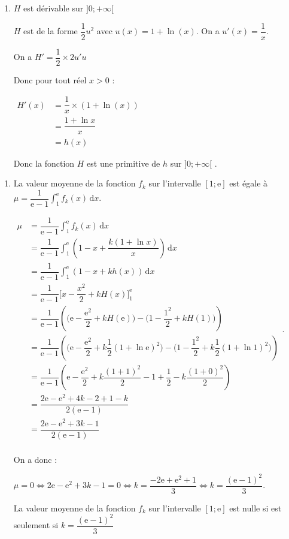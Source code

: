 \documentclass[10pt]{article}
\providecommand{\e}{{\mathrm{e}}}
\renewcommand{\d}{{\mathrm{d}}}
\providecommand{\ds}{\displaystyle}
\begin{document}
\begin{enumerate}
	\item 
	
	$H$ est dérivable sur $] 0 ;+\infty[$ 
	
	$H$ est de la forme $\dfrac{1}{2}u^2$ avec $u(x) = 1 + \ln(x)$. On a  $u'(x) = \dfrac{1}{x}$. 
	
	On a $H'= \dfrac{1}{2} \times 2 u'u $ 
	
	Donc pour tout réel $x>0$ : 
	
	$\begin{aligned} H'(x) &= \dfrac{1}{x} \times \left(1 + \ln(x) \right) \\
		&= \dfrac{1+\ln x}{x} \\
		&=h(x)
		\end{aligned}$	
		
		Donc la fonction $H$ est une primitive de $h$ sur $] 0 ;+\infty[$ . 
	
	
\end{enumerate}



\begin{enumerate}[resume]
	\item La valeur moyenne de la fonction $f_{k}$ sur l'intervalle $[ 1 ; \e]$ est égale à $\ds \mu= \dfrac{1}{\e-1} \int_1^{\e} f_k(x) \,\d x$. 
	
	
	
	$\begin{aligned}  \ds \mu& = \dfrac{1}{\e-1} \int_1^{\e} f_k(x) \,\d x\\
		&= \dfrac{1}{\e-1} \int_1^{\e}   \left(1-x+\dfrac{k(1+\ln x)}{x}  \right)\,\d x\\
		&= \dfrac{1}{\e-1} \int_1^{\e}   \left(1-x+kh(x)  \right)\,\d x\\
		&= \dfrac{1}{\e-1} \Big[x-\dfrac{x^2}{2} + kH(x)\Big]_1^{\e} \\
		&= \dfrac{1}{\e-1} \left( \Big(\e-\dfrac{\e^2}{2} + kH(\e)\Big) -  \Big(1-\dfrac{1^2}{2} + kH(1)\Big)  \right) \\
		&= \dfrac{1}{\e-1} \left( \Big(\e-\dfrac{\e^2}{2} + k\dfrac{1}{2}(1+\ln \e)^{2} \Big) -  \Big(1-\dfrac{1^2}{2} + k\dfrac{1}{2}(1+\ln 1)^{2}\Big)  \right) \\
			&= \dfrac{1}{\e-1} \left( \e-\dfrac{\e^2}{2} + k\dfrac{(1+1)^2}{2} -  1+\dfrac{1}{2} - k\dfrac{(1+0)^2}{2}\right) \\
		&= \dfrac{ 2\e-\e^2 + 4k -  2+1- k}{2(\e-1)}\\
			&= \dfrac{ 2\e-\e^2 + 3k -  1}{2(\e-1)}\\
		\end{aligned}$.
	
	
	
	
On a donc : 

$\mu =0 \iff 2\e-\e^2 + 3k -  1 =0 \iff   k= \dfrac{-2\e+\e^2 +   1}{3} \iff k= \dfrac{(\e-1)^2}{3}$. 


	
	La valeur moyenne de la fonction $f_{k}$ sur l'intervalle $[ 1 ; \e]$ est  nulle si est seulement si $k=   \dfrac{(\e-1)^2}{3}$
\end{enumerate}
\end{document}
